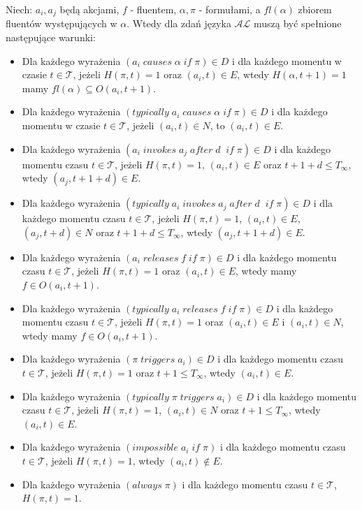 Niech: $a_i,a_j$ będą akcjami, $ f $ - fluentem, $\alpha, \pi$ - formułami, a $fl(\alpha)$ zbiorem fluentów
występujących w $\alpha$. Wtedy dla zdań języka $\mathcal{AL}$  muszą być spełnione następujące warunki:
   \begin{itemize}
   		\item Dla każdego wyrażenia $ ( a_i\;causes\;\alpha\;if\;\pi)\in D $ i dla każdego momentu w czasie
   		$t \in \mathcal{T}$, jeżeli $H(\pi,t)=1$ oraz $(a_i,t) \in E$, wtedy $H(\alpha,t + 1)=1$ mamy $fl(\alpha)\subseteq O(a_i,t + 1)$.
		\item Dla każdego wyrażenia $ ( typically\; a_i\;causes\;\alpha\;if\;\pi)\in D $ i dla każdego momentu w czasie
		 $t \in \mathcal{T}$, jeżeli $(a_i,t) \in N$, to $(a_i,t) \in E$.
 		\item Dla każdego wyrażenia $( a_i\;invokes\;a_j\;after\;d\;\;if\;\pi)\in D$ i dla każdego momentu czasu
 		$t \in \mathcal{T}$, jeżeli $H(\pi,t)=1$, $(a_i,t)\in E $ oraz $t+1+d\leq T_{\infty}$, wtedy $(a_j,t+1+d) \in E $.
	 	\item Dla każdego wyrażenia $( typically\; a_i\;invokes\;a_j\;after\;d\;\;if\;\pi)\in D$ i dla każdego momentu czasu
	 	$t \in \mathcal{T}$, jeżeli $H(\pi,t)=1$, $(a_i,t)\in E$, $(a_j, t + d)\in N $ oraz $t+1+d\leq T_{\infty}$, wtedy $(a_j,t+1+d) \in E $.
   		\item Dla każdego wyrażenia $( a_i\;releases\;f\;if\;\pi)\in D $ i dla każdego momentu czasu
   		$t \in \mathcal{T}$, jeżeli $H(\pi,t)=1$ oraz $(a_i,t)\in E$, wtedy mamy $f\in O(a_i,t+1)$.
 		\item Dla każdego wyrażenia $( typically\; a_i \;releases\;f\;if\;\pi)\in D $ i dla każdego momentu czasu
 		$t \in \mathcal{T}$, jeżeli $H(\pi,t)=1$ oraz $(a_i,t)\in E$ i $(a_i,t)\in N$, wtedy mamy $f\in O(a_i,t+1)$.
   		\item Dla każdego wyrażenia $(\pi\;triggers\; a_i)\in D$ i dla każdego momentu czasu $t \in \mathcal{T}$,
   		jeżeli $H(\pi,t)=1$ oraz $t+1\leq T_{\infty}$, wtedy $(a_i,t)\in E$.
		\item Dla każdego wyrażenia $(typically\; \pi\;triggers\; a_i)\in D$ i dla każdego momentu czasu
		$t \in \mathcal{T}$, jeżeli $H(\pi,t)=1$, $(a_i, t)\in N$ oraz $t+1\leq T_{\infty}$, wtedy $(a_i,t)\in E$.
		\item Dla każdego wyrażenia $(impossible \; a_i \; if\;  \pi )$ i dla każdego momentu czasu $t \in \mathcal{T}$,
		jeżeli $H(\pi,t)=1$, wtedy $(a_i,t) \notin E $.
		\item Dla każdego wyrażenia $(always \; \pi )$ i dla każdego momentu czasu $t \in \mathcal{T}$, $H(\pi,t)=1$.
   \end{itemize}
